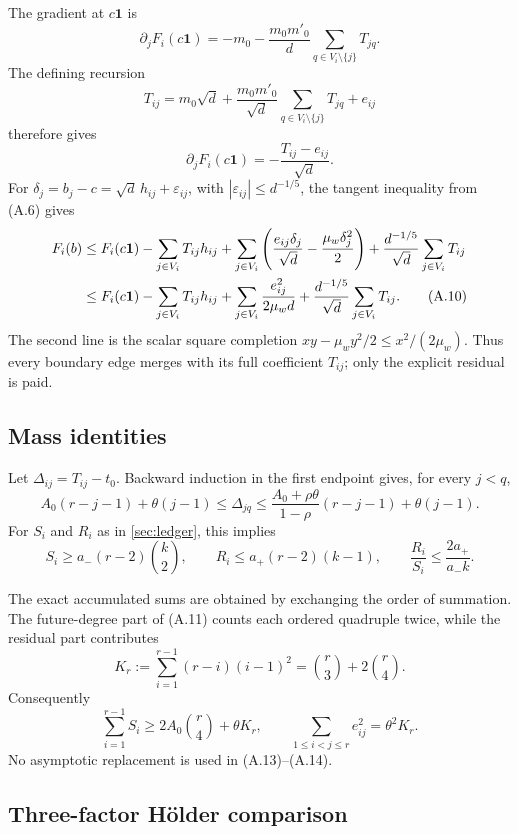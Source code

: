 The gradient at $c\mathbf1$ is
\[
 \partial_jF_i(c\mathbf1)
 =-m_0-\frac{m_0m'_0}{d}
   \sum_{q\in V_i\setminus\{j\}}T_{jq}.
\tag{A.7}
\]
The defining recursion
\[
 T_{ij}=m_0\sqrt d+\frac{m_0m'_0}{\sqrt d}
 \sum_{q\in V_i\setminus\{j\}}T_{jq}+e_{ij}
\tag{A.8}
\]
therefore gives
\[
 \partial_jF_i(c\mathbf1)=-\frac{T_{ij}-e_{ij}}{\sqrt d}.
\tag{A.9}
\]
For $\delta_j=b_j-c=\sqrt d\,h_{ij}+\varepsilon_{ij}$, with
$|\varepsilon_{ij}|\le d^{-1/5}$, the tangent inequality from (A.6) gives
\begin{align}
 F_i(b)
 &\le F_i(c\mathbf1)
 -\sum_{j\in V_i}T_{ij}h_{ij}
 +\sum_{j\in V_i}\left(
   \frac{e_{ij}\delta_j}{\sqrt d}-\frac{\mu_w\delta_j^2}{2}\right)
 +\frac{d^{-1/5}}{\sqrt d}\sum_{j\in V_i}T_{ij} \notag\\
 &\le F_i(c\mathbf1)-\sum_{j\in V_i}T_{ij}h_{ij}
 +\sum_{j\in V_i}\frac{e_{ij}^2}{2\mu_wd}
 +\frac{d^{-1/5}}{\sqrt d}\sum_{j\in V_i}T_{ij}. \tag{A.10}
\end{align}
The second line is the scalar square completion
$xy-\mu_wy^2/2\le x^2/(2\mu_w)$.  Thus every boundary edge merges with
its full coefficient $T_{ij}$; only the explicit residual is paid.

\subsection{Mass identities}

Let $\Delta_{ij}=T_{ij}-t_0$.  Backward induction in the first endpoint
gives, for every $j<q$,
\[
 A_0(r-j-1)+\theta(j-1)
 \le \Delta_{jq}
 \le \frac{A_0+\rho\theta}{1-\rho}(r-j-1)+\theta(j-1).
\tag{A.11}
\]
For $S_i$ and $R_i$ as in \cref{sec:ledger}, this implies
\[
 S_i\ge a_-(r-2)\binom{k}{2},\qquad
 R_i\le a_+(r-2)(k-1),\qquad
 \frac{R_i}{S_i}\le\frac{2a_+}{a_-k}. \tag{A.12}
\]

The exact accumulated sums are obtained by exchanging the order of
summation.  The future-degree part of (A.11) counts each ordered quadruple
twice, while the residual part contributes
\[
 K_r:=\sum_{i=1}^{r-1}(r-i)(i-1)^2
 =\binom r3+2\binom r4. \tag{A.13}
\]
Consequently
\[
 \sum_{i=1}^{r-1}S_i\ge2A_0\binom r4+\theta K_r,
 \qquad
 \sum_{1\le i<j\le r}e_{ij}^2=\theta^2K_r. \tag{A.14}
\]
No asymptotic replacement is used in (A.13)--(A.14).

\subsection{Three-factor H\"older comparison}

